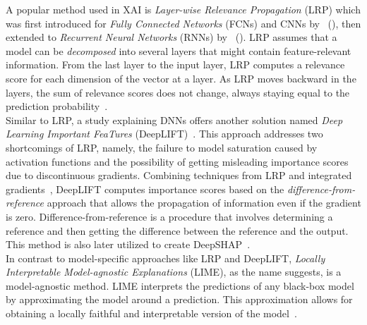 A popular method used in XAI is \emph{Layer-wise Relevance Propagation} (LRP) which was first introduced for \emph{Fully Connected Networks} (FCNs) and CNNs by~\citeauthor{LRP_Lapuschkin} (\citeyear{LRP_Lapuschkin}), then extended to \emph{Recurrent Neural Networks} (RNNs) by~\citeauthor{ExplainingRNNs_Arras} (\citeyear{ExplainingRNNs_Arras}). LRP assumes that a model can be \emph{decomposed} into several layers that might contain feature-relevant information. From the last layer to the input layer, LRP computes a relevance score for each dimension of the vector at a layer. As LRP moves backward in the layers, the sum of relevance scores does not change, always staying equal to the prediction probability~\parencite{LRP_Lapuschkin}.\\
Similar to LRP, a study explaining DNNs offers another solution named \emph{Deep Learning Important FeaTures} (DeepLIFT)~\parencite{DeepLIFT_Shrikumar}. This approach addresses two shortcomings of LRP, namely, the failure to model saturation caused by activation functions and the possibility of getting misleading importance scores due to discontinuous gradients. Combining techniques from LRP and integrated gradients~\parencite{GradientsOfCounterfactuals_Sundararajan}, DeepLIFT computes importance scores based on the \emph{difference-from-reference} approach that allows the propagation of information even if the gradient is zero. Difference-from-reference is a procedure that involves determining a reference and then getting the difference between the reference and the output. This method is also later utilized to create DeepSHAP~\parencite{AUnifiedApproach_Lundberg}.\\
In contrast to model-specific approaches like LRP and DeepLIFT, \emph{Locally Interpretable Model-agnostic Explanations} (LIME), as the name suggests, is a model-agnostic method. LIME interprets the predictions of any black-box model by approximating the model around a prediction. This approximation allows for obtaining a locally faithful and interpretable version of the model~\parencite{WhyShouldITrustYou_Riberio}.\\
